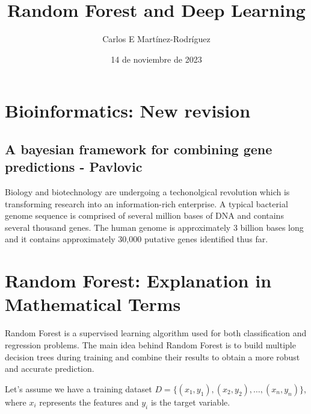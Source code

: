 \documentclass[12pt]{article}
\title{Random Forest and Deep Learning}
\author{Carlos E Mart\'inez-Rodr\'iguez}
\date{14  de noviembre de 2023}  %
\begin{document}
\maketitle
\tableofcontents

\newpage
\section{Bioinformatics: New revision}

\subsection{A bayesian framework for combining gene predictions - Pavlovic}

Biology and biotechnology are undergoing a techonolgical revolution which is transforming research into an information-rich enterprise.  A typical bacterial genome sequence is comprised of several million bases of DNA and contains several thousand genes. The human genome is approximately 3 billion bases long and it contains approximately 30,000 putative genes identified thus far.



\section{Random Forest: Explanation in Mathematical Terms}

Random Forest is a supervised learning algorithm used for both classification and regression problems. The main idea behind Random Forest is to build multiple decision trees during training and combine their results to obtain a more robust and accurate prediction.

Let's assume we have a training dataset \(D = \{(x_1, y_1), (x_2, y_2), \ldots, (x_n, y_n)\}\), where \(x_i\) represents the features and \(y_i\) is the target variable.
\end{document}
